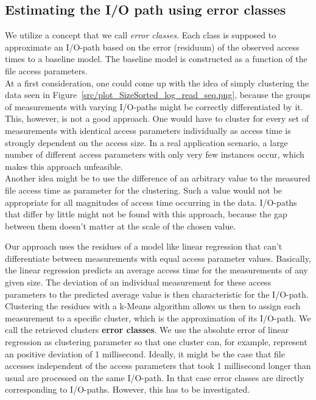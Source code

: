 \documentclass{superfri}
\begin{document}
\subsection{Estimating the I/O path using error classes}
\label{sec:error_classes}
We utilize a concept that we call \textit{error classes}.
Each class is supposed to approximate an I/O-path based on the error (residuum) of the observed access times to a baseline model.
The baseline model is constructed as a function of the file access parameters.\\

At a first consideration, one could come up with the idea of simply clustering the data seen in Figure~\ref{src/plot_SizeSorted_log_read_seq.png}, because the groups of measurements with varying I/O-paths might be correctly differentiated by it. 
This, however, is not a good approach. One would have to cluster for every set of measurements with identical access parameters individually as access time is strongly dependent on the access size. 
In a real application scenario, a large number of different access parameters with only very few instances occur, which makes this approach unfeasible.\\
Another idea might be to use the difference of an arbitrary value to the measured file access time as parameter for the clustering. 
Such a value would not be appropriate for all magnitudes of access time occurring in the data.
I/O-paths that differ by little might not be found with this approach, because the gap between them doesn't matter at the scale of the chosen value.

Our approach uses the residues of a model like linear regression that can't differentiate between measurements with equal access parameter values.
Basically, the linear regression predicts an average access time for the measurements of any given size.
The deviation of an individual measurement for these access parameters to the predicted average value is then characteristic for the I/O-path.
Clustering the residues with a k-Means algorithm allows us then to assign each measurement to a specific cluster, which is the approximation of its I/O-path.
We call the retrieved clusters \textbf{error classes}.
We use the absolute error of linear regression as clustering parameter so that one cluster can, for example, represent an positive deviation of 1 millisecond.
Ideally, it might be the case that file accesses independent of the access parameters that took 1 millisecond longer than usual are processed on the same I/O-path.
In that case error classes are directly corresponding to I/O-paths. 
However, this has to be investigated.
\end{document}
